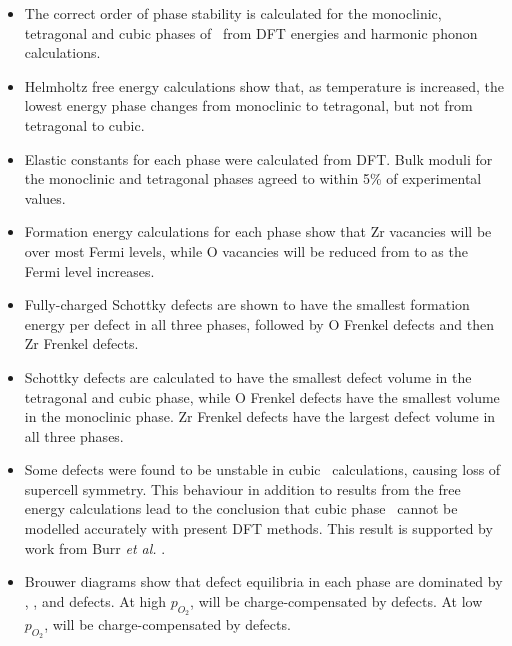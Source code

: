 \begin{itemize}
\item The correct order of phase stability is calculated for the monoclinic, tetragonal and cubic phases of \zirconia\ from DFT energies and harmonic phonon calculations. 
\item Helmholtz free energy calculations show that, as temperature is increased, the lowest energy phase changes from monoclinic to tetragonal, but not from tetragonal to cubic.
\item Elastic constants for each phase were calculated from DFT. Bulk moduli for the monoclinic and tetragonal phases agreed to within 5\% of experimental values. 
\item Formation energy calculations for each phase show that Zr vacancies will be  over most Fermi levels, while O vacancies will be reduced from  to  as the Fermi level increases.
\item Fully-charged Schottky defects are shown to have the smallest formation energy per defect in all three phases, followed by O Frenkel defects and then Zr Frenkel defects.
\item Schottky defects are calculated to have the smallest defect volume in the tetragonal and cubic phase, while O Frenkel defects have the smallest volume in the monoclinic phase. Zr Frenkel defects have the largest defect volume in all three phases.
\item Some defects were found to be unstable in cubic \zirconia\ calculations, causing loss of supercell symmetry. This behaviour in addition to results from the free energy calculations lead to the conclusion that cubic phase \zirconia\ cannot be modelled accurately with present DFT methods. This result is supported by work from Burr \emph{et al.} \cite{burr2017importance}.
\item Brouwer diagrams show that defect equilibria in each phase are dominated by , ,  and  defects. At high $p_{O_{2}}$,  will be charge-compensated by  defects. At low $p_{O_{2}}$,  will be charge-compensated by  defects.
\end{itemize}